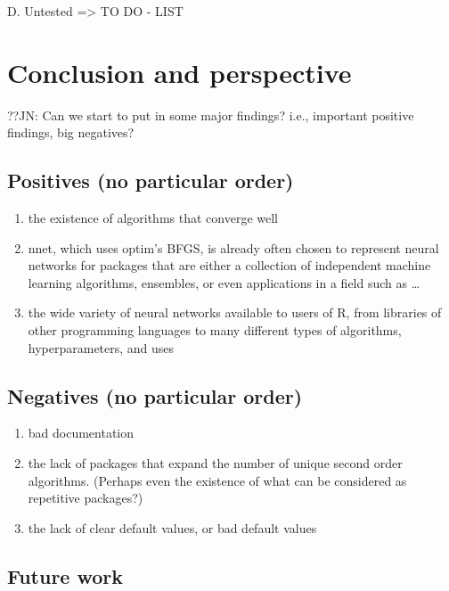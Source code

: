 D. Untested =\textgreater{} TO DO - LIST

\hypertarget{conclusion-and-perspective}{%
\section{Conclusion and perspective}\label{conclusion-and-perspective}}

??JN: Can we start to put in some major findings? i.e., important
positive findings, big negatives?

\hypertarget{positives-no-particular-order}{%
\subsection{Positives (no particular
order)}\label{positives-no-particular-order}}

\begin{enumerate}
\def\labelenumi{\arabic{enumi}.}
\tightlist
\item
  the existence of algorithms that converge well
\item
  nnet, which uses optim's BFGS, is already often chosen to represent
  neural networks for packages that are either a collection of
  independent machine learning algorithms, ensembles, or even
  applications in a field such as \ldots{}
\item
  the wide variety of neural networks available to users of R, from
  libraries of other programming languages to many different types of
  algorithms, hyperparameters, and uses
\end{enumerate}

\hypertarget{negatives-no-particular-order}{%
\subsection{Negatives (no particular
order)}\label{negatives-no-particular-order}}

\begin{enumerate}
\def\labelenumi{\arabic{enumi}.}
\tightlist
\item
  bad documentation
\item
  the lack of packages that expand the number of unique second order
  algorithms. (Perhaps even the existence of what can be considered as
  repetitive packages?)
\item
  the lack of clear default values, or bad default values
\end{enumerate}

\hypertarget{future-work}{%
\subsection{Future work}\label{future-work}}

